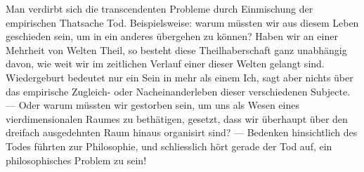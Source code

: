 Man verdirbt sich die transcendenten Probleme durch Einmischung der empirischen Thatsache Tod. Beispielsweise: warum müssten wir aus diesem Leben geschieden sein, um in ein anderes übergehen zu können? Haben wir an einer Mehrheit von Welten Theil, so besteht diese Theilhaberschaft ganz unabhängig davon, wie weit wir im zeitlichen Verlauf einer dieser Welten gelangt sind. Wiedergeburt bedeutet nur ein Sein in mehr als einem Ich, sagt aber nichts über das empirische Zugleich- oder Nacheinanderleben dieser verschiedenen Subjecte. — Oder warum müssten wir gestorben sein, um uns als Wesen eines vierdimensionalen Raumes zu bethätigen, gesetzt, dass wir überhaupt über den dreifach ausgedehnten Raum hinaus organisirt sind? — Bedenken hinsichtlich des Todes führten zur Philosophie, und schliesslich hört gerade der Tod auf, ein philosophisches Problem zu sein!
\par

